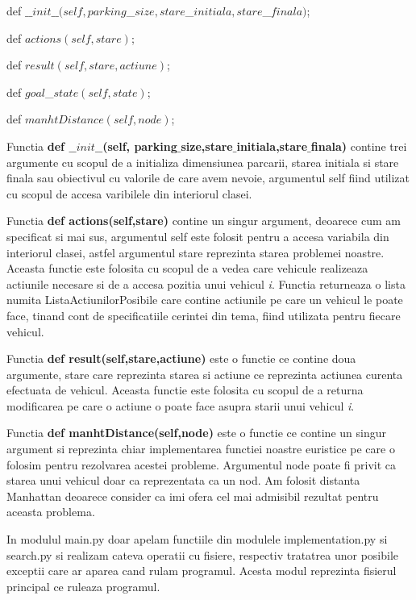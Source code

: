 \documentclass{article}
\begin{document}
\begin{flushleft}
\begin{itemize}
\bfseries{
  \item def $\_\_init\_\_(self, parking$\_$size,stare$\_$initiala,stare$\_$finala)$;
  \item def $actions(self,stare)$;
  \item def $result(self,stare,actiune)$;
  \item def $goal$\_$state(self,state)$;
  \item def $manhtDistance(self,node)$;}
\end{itemize}
\vspace{25mm}
\quad Functia \textbf{def $\_\_init\_\_$(self, parking$\_$size,stare$\_$initiala,stare$\_$finala)} contine trei argumente cu scopul de a initializa dimensiunea parcarii, starea initiala si stare finala sau obiectivul cu valorile de care avem nevoie, argumentul self fiind utilizat cu scopul de accesa varibilele  din interiorul clasei. \par
\quad Functia \textbf{def actions(self,stare)} contine un singur argument, deoarece cum am specificat si mai sus, argumentul self este folosit pentru a accesa variabila din interiorul clasei, astfel argumentul stare reprezinta starea problemei noastre. Aceasta functie este folosita cu scopul de a vedea care vehicule realizeaza actiunile necesare si de a accesa pozitia unui vehicul \emph i. Functia returneaza o lista numita ListaActiunilorPosibile care contine actiunile pe care un vehicul le poate face, tinand cont de specificatiile cerintei din tema, fiind utilizata pentru fiecare vehicul.\par
\quad Functia \textbf{def result(self,stare,actiune)} este o functie ce contine doua argumente, stare care reprezinta starea si actiune ce reprezinta actiunea curenta efectuata de vehicul. Aceasta functie este folosita cu scopul de a returna modificarea pe care o actiune o poate face asupra starii unui vehicul \emph i.\par
\quad Functia \textbf{def manhtDistance(self,node)} este o functie ce contine un singur argument si reprezinta chiar implementarea functiei noastre euristice pe care o folosim pentru rezolvarea acestei probleme. Argumentul node poate fi privit ca starea unui vehicul doar ca reprezentata ca un nod. Am folosit distanta Manhattan deoarece consider ca imi ofera cel mai admisibil rezultat pentru aceasta problema.\par
\vspace{5mm}
\quad In modulul main.py doar apelam functiile din modulele implementation.py si search.py si realizam cateva operatii cu fisiere, respectiv tratatrea unor posibile exceptii care ar aparea cand rulam programul. Acesta modul reprezinta fisierul principal ce ruleaza programul. \par

\end{flushleft}
\end{document}
